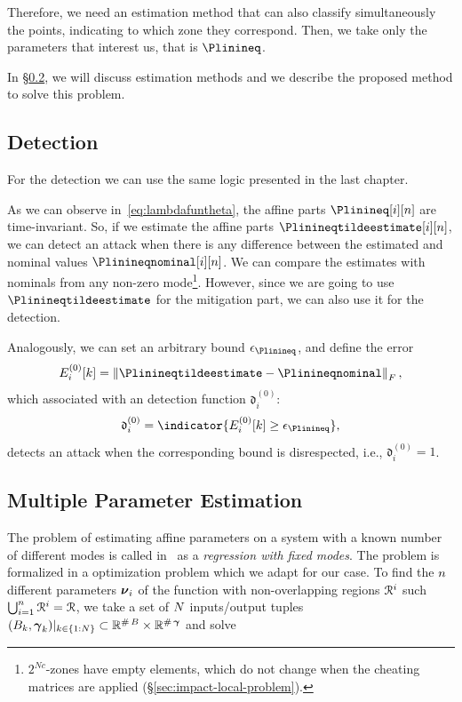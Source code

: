 \documentclass[../main.tex]{subfiles}
\begin{document}
Therefore, we need an estimation method that can also classify simultaneously the points, indicating to which zone they correspond.
Then, we take only the parameters that interest us, that is $\Plinineq$.

In \S\ref{sec:cons-about-mult}, we will discuss estimation methods and we describe the proposed method to solve this problem.

\subsection{Detection}\label{sec:detection_ineq}
For the detection we can use the same logic presented in the last chapter.

As we can observe in~\eqref{eq:lambdafuntheta}, the affine parts $\Plinineq[i][n]$ are time-invariant.
So, if we estimate the affine parts $\Plinineqtildeestimate[i][n]$, we can detect an attack when there is any difference between the estimated and nominal values $\Plinineqnominal[i][n]$.
We can compare the estimates with nominals from any non-zero mode\footnote{$2^{Nc}$-zones have empty elements, which do not change when the cheating matrices are applied (\S\ref{sec:impact-local-problem}).}.
However, since we are going to use $\Plinineqtildeestimate$ for the mitigation part, we can also use it for the detection.

Analogously, we can set an arbitrary bound $\epsilon_{\Plinineq}$, and define the error
\begin{equation}
  E_{i}^{(0)}[k] =\norm{\Plinineqtildeestimate-\Plinineqnominal}_{F},
\end{equation}
which associated with an detection function $\mathfrak{d}_{i}^{(0)}$:
\begin{equation}
  \label{eq:detection_ineq}
  \mathfrak{d}_{i}^{(0)}=\indicator{E_{i}^{(0)}[k]\geq\epsilon_{\Plinineq}},
\end{equation}
detects an attack when the corresponding bound is disrespected, i.e., $\mathfrak{d}_{i}^{(0)}=1$.

\subsection{Multiple Parameter Estimation}\label{sec:cons-about-mult}
The problem of estimating affine parameters on a system with a known number of different modes is called in~\cite{LauerBloch2019} as a \emph{\pwa{} regression with fixed modes}.
The problem is formalized in a optimization problem which we adapt for our case.
To find the ${n}$ different parameters ${\boldsymbol{\nu}}_{i}$ of the \pwa{} function with non-overlapping regions $\mathcal{R}^{i}$ such $\bigcup_{i=1}^{{n}}\mathcal{R}^{i}=\mathcal{R}$, we take a set of ${N}$ inputs/output tuples $({B}_{k},{\boldsymbol{\gamma}}_{k})|_{k\in\{1:{N}\}}\subset\mathbb{R}^{\operatorname{\#}{{B}}}\times\mathbb{R}^{\operatorname{\#}{{\boldsymbol{\gamma}}}}$ and solve
\end{document}
